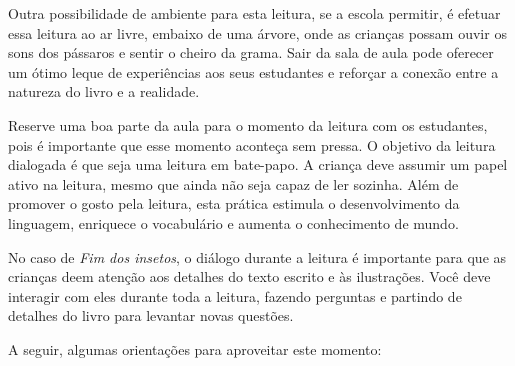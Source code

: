 \documentclass[11pt]{extarticle}
\begin{document}
Outra possibilidade de ambiente para esta leitura, se a escola permitir, 
é efetuar essa leitura ao ar livre, embaixo de uma árvore, onde as crianças 
possam ouvir os sons dos pássaros e sentir o cheiro da grama. Sair da sala 
de aula pode oferecer um ótimo leque de experiências aos seus estudantes e 
reforçar a conexão entre a natureza do livro e a realidade.  

Reserve uma boa parte da aula para o momento da leitura com os estudantes, 
pois é importante que esse momento aconteça sem pressa. O objetivo da 
leitura dialogada é que seja uma leitura em bate-papo. A criança deve 
assumir um papel ativo na leitura, mesmo que ainda não seja capaz de 
ler sozinha. Além de promover o gosto pela leitura, esta prática estimula 
o desenvolvimento da linguagem, enriquece o vocabulário e 
aumenta o conhecimento de mundo.

No caso de \textit{Fim dos insetos}, o diálogo durante a leitura é 
importante para que as crianças deem atenção aos detalhes
do texto escrito e às ilustrações.
Você deve interagir com eles durante toda a 
leitura, fazendo perguntas e partindo de detalhes do livro para 
levantar novas questões. 

A seguir, algumas orientações para aproveitar este momento: 
\end{document}
